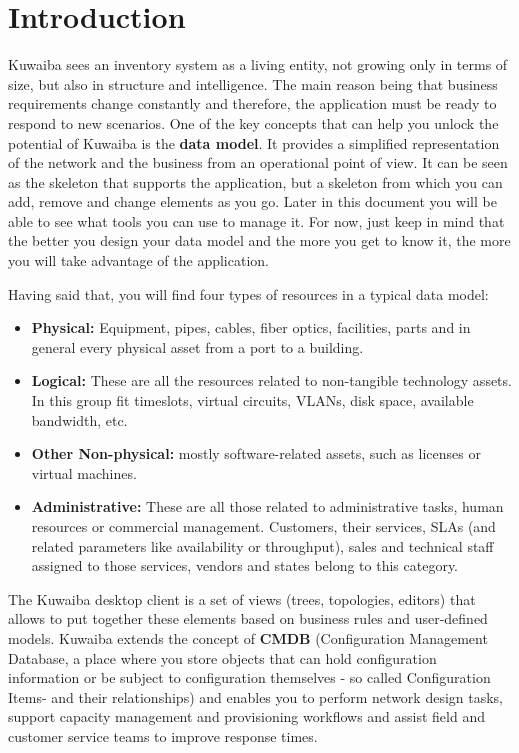 \documentclass[a4paper]{article}
\begin{document}
	\clearpage
	\section{Introduction}
	Kuwaiba sees an inventory system as a living entity, not growing only in terms of size, but also in structure and intelligence. The main reason being that business requirements change constantly and therefore, the application must be ready to respond to new scenarios. One of the key concepts that can help you unlock the potential of Kuwaiba is the \textbf{data model}. It provides a simplified representation of the network and the business from an operational point of view. It can be seen as the skeleton that supports the application, but a skeleton from which you can add, remove and change elements as you go. Later in this document you will be able to see what tools you can use to manage it. For now, just keep in mind that the better you design your data model and the more you get to know it, the more you will take advantage of the application.\newline
	
	Having said that, you will find four types of resources in a typical data model:
	\begin{itemize}
		\item \textbf{Physical:} Equipment, pipes, cables, fiber optics, facilities, parts and in general every physical asset from a port to a building. 
		\item \textbf{Logical:} These are all the resources related to non-tangible technology assets. In this group fit timeslots, virtual circuits, VLANs, disk space, available bandwidth, etc.
		\item \textbf{Other Non-physical:} mostly software-related assets, such as licenses or virtual machines.
		\item \textbf{Administrative:} These are all those related to administrative tasks, human resources or commercial management. Customers, their services, SLAs (and related parameters like availability or throughput), sales and technical staff assigned to those services, vendors and states belong to this category.
	\end{itemize}
	The Kuwaiba desktop client is a set of views (trees, topologies, editors) that allows to put together these elements based on business rules and  user-defined models. Kuwaiba extends the concept of \textbf{CMDB} (Configuration Management Database, a place where you store objects that can hold configuration information or be subject to configuration themselves - so called Configuration Items- and their relationships)  and enables you to perform network design tasks, support capacity management and provisioning workflows and assist field and customer service teams to improve response times.\newline
	
\end{document}
